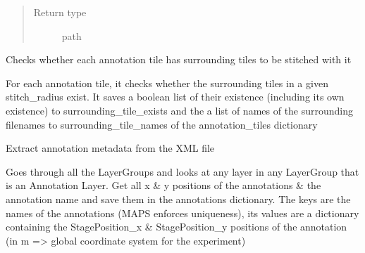 \documentclass[letterpaper,10pt,english]{sphinxmanual}
\begin{document}
\begin{fulllineitems}
\begin{fulllineitems}
\begin{quote}
\begin{description}
\item[{Return type}] \leavevmode
path

\end{description}\end{quote}

\end{fulllineitems}


\begin{fulllineitems}
\label{\detokenize{index:sites_of_interest_parser.MapsXmlParser.determine_surrounding_tiles}}
Checks whether each annotation tile has surrounding tiles to be stitched with it

For each annotation tile, it checks whether the surrounding tiles in a given stitch\_radius exist. It saves a
boolean list of their existence (including its own existence) to surrounding\_tile\_exists and the a list of names
of the surrounding filenames to surrounding\_tile\_names of the annotation\_tiles dictionary

\end{fulllineitems}


\begin{fulllineitems}
\label{\detokenize{index:sites_of_interest_parser.MapsXmlParser.extract_annotation_locations}}
Extract annotation metadata from the XML file

Goes through all the LayerGroups and looks at any layer in any LayerGroup that is an Annotation Layer. Get all
x \& y positions of the annotations \& the annotation name and save them in the annotations dictionary.
The keys are the names of the annotations (MAPS enforces uniqueness), its values are a dictionary containing the
StagePosition\_x \& StagePosition\_y positions of the annotation (in m =\textgreater{} global coordinate system for the
experiment)

\end{fulllineitems}


\end{fulllineitems}
\end{document}
